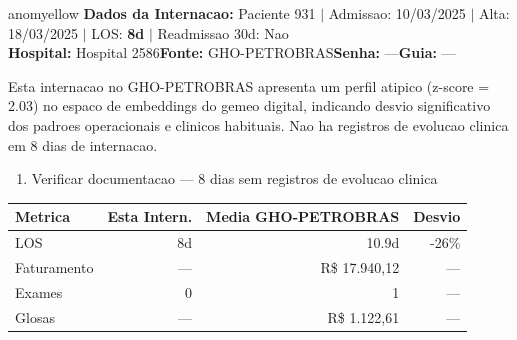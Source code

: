 \documentclass[a4paper,10pt]{article}
\begin{document}
\begin{anomalycard}[Internacao 124207 | GHO-PETROBRAS | MODERADO (z=2.03)]{anomyellow}
\textbf{Dados da Internacao:} Paciente 931 $\mid$ Admissao: 10/03/2025 $\mid$ Alta: 18/03/2025 $\mid$ LOS: \textbf{8d} $\mid$ Readmissao 30d: Nao\\
\textbf{Hospital:} Hospital 2586\quad\textbf{Fonte:} GHO-PETROBRAS\quad\textbf{Senha:} ---\quad\textbf{Guia:} ---\\
\vspace{2pt}\begin{tcolorbox}[colback=severityred!20,colframe=anomyellow,title={\textbf{Interpretacao de Negocio}},fonttitle=\bfseries\small,left=4pt,right=4pt,top=3pt,bottom=3pt]
{\small Esta internacao no GHO-PETROBRAS apresenta um perfil atipico (z-score = 2.03) no espaco de embeddings do gemeo digital, indicando desvio significativo dos padroes operacionais e clinicos habituais. Nao ha registros de evolucao clinica em 8 dias de internacao.}
\end{tcolorbox}
\begin{tcolorbox}[colback=severityyellow!30,colframe=anomorange,title={\textbf{Recomendacoes Especificas}},fonttitle=\bfseries\small,left=4pt,right=4pt,top=3pt,bottom=3pt]
\begin{enumerate}[nosep,leftmargin=16pt]
\item {\small Verificar documentacao --- 8 dias sem registros de evolucao clinica}
\end{enumerate}
\end{tcolorbox}
\begin{center}\begin{tabular}{l r r r}\toprule\textbf{Metrica} & \textbf{Esta Intern.} & \textbf{Media GHO-PETROBRAS} & \textbf{Desvio} \\\midrule
LOS & 8d & 10.9d & -26\% \\
Faturamento & --- & R\$ 17.940,12 & --- \\
Exames & 0 & 1 & --- \\
Glosas & --- & R\$ 1.122,61 & --- \\
\bottomrule\end{tabular}\end{center}


\end{anomalycard}
\end{document}
